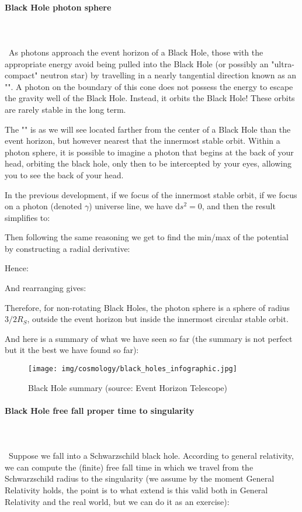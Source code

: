 	\paragraph{Black Hole photon sphere}\mbox{}\\\\\
 	As photons approach the event horizon of a Black Hole, those with the appropriate energy avoid being pulled into the Black Hole (or possibly an "ultra-compact" neutron star) by travelling in a nearly tangential direction known as an "". A photon on the boundary of this cone does not possess the energy to escape the gravity well of the Black Hole. Instead, it orbits the Black Hole! These orbits are rarely stable in the long term.

	The "\label{photon sphere}" is as we will see located farther from the center of a Black Hole than the event horizon, but however nearest that the innermost stable orbit. Within a photon sphere, it is possible to imagine a photon that begins at the back of your head, orbiting the black hole, only then to be intercepted by your eyes, allowing you to see the back of your head.

 	In the previous development, if we focus of the innermost stable orbit, if we focus on a photon (denoted $\gamma$) universe line, we have $\mathrm{d}s^2=0$, and then the result simplifies to:
 	
 	Then following the same reasoning we get to find the min/max of the potential by constructing a radial derivative:
	
	Hence:
	
	And rearranging gives:
	
	Therefore, for non-rotating Black Holes, the photon sphere is a sphere of radius $3/2 R_S$, outside the event horizon but inside the innermost circular stable orbit.
	
	And here is a summary of what we have seen so far (the summary is not perfect but it the best we have found so far):
	\begin{figure}[H]
		\centering
		\texttt{[image: img/cosmology/black\_holes\_infographic.jpg]}
		\caption[Black Hole summary ]{Black Hole summary (source: Event Horizon Telescope)}
	\end{figure}
	
	\pagebreak
	\paragraph{Black Hole free fall proper time to singularity}\mbox{}\\\\\
	Suppose we fall into a Schwarzschild black hole. According to general relativity, we can compute the (finite) free fall time in which we travel from the Schwarzschild radius to the singularity (we assume by the moment General Relativity holds, the point is to what extend is this valid both in General Relativity and the real world, but we can do it as an exercise):
	
